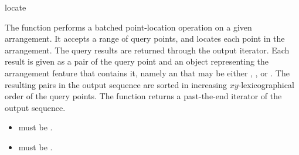 \ccRefPageBegin

\begin{ccRefFunction}{locate}

\ccDefinition

The function \ccRefName{} performs a batched point-location operation on a
given arrangement. It accepts a range of query points, and locates each
point in the arrangement. The query results are returned through the output
iterator. Each result is given as a pair of the query point and an object
representing the arrangement feature that contains it, namely an
 that may be either ,
, or . The resulting
pairs in the output sequence are sorted in increasing $xy$-lexicographical
order of the query points. The function returns a past-the-end iterator of
the output sequence.



\ccRequirements
\begin{itemize}
\item {} must be .
\item {} must be
  .
\end{itemize}

\end{ccRefFunction}

\ccRefPageEnd
